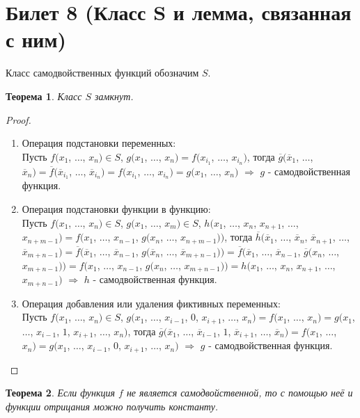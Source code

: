 \documentclass[a4paper, 12pt]{article}
\theoremstyle{definition}
\theoremstyle{plain}
\newtheorem*{theorem}{Теорема}
\theoremstyle{remark}
\begin{document}
  \section{Билет 8 (Класс S и лемма, связанная с ним)}
  Класс самодвойственных функций обозначим $S$.
  \begin{theorem}
    Класс $S$ замкнут.
  \end{theorem}
  \begin{proof}
    \begin{enumerate}
      \item Операция подстановки переменных:\\
      Пусть $f(x_1$, $\ldots$, $x_n)\in S$, $g(x_1$, $\ldots$, $x_n)=f(x_{i_1}$, $\ldots$, $x_{i_n})$, тогда $\overline{g}(\overline{x}_1$, $\ldots$, $\overline{x}_n)=\overline{f}(\overline{x}_{i_1}$, $\ldots$, $\overline{x}_{i_n})=f(x_{i_1}$, $\ldots$, $x_{i_n})=g(x_1$, $\ldots$, $x_n)$ $\Longrightarrow$ $g$ - самодвойственная функция.
      \item Операция подстановки функции в функцию:\\
      Пусть $f(x_1$, $\ldots$, $x_n)\in S$, $g(x_1$, $\ldots$, $x_m)\in S$, $h(x_1$, $\ldots$, $x_n$, $x_{n+1}$, $\ldots$, $x_{n+m-1})=f(x_1$, $\ldots$, $x_{n-1}$, $g(x_n$, $\ldots$, $x_{n+m-1}))$, тогда $\overline{h}(\overline{x}_1$, $\ldots$, $\overline{x}_n$, $\overline{x}_{n+1}$, $\ldots$, $\overline{x}_{m+n-1})=\overline{f}(\overline{x}_1$, $\ldots$, $\overline{x}_{n-1}$, $g(\overline{x}_{n}$, $\ldots$, $\overline{x}_{m+n-1}))=\overline{f}(\overline{x}_1$, $\ldots$, $\overline{x}_{n-1}$, $\overline{g}(x_{n}$, $\ldots$, $x_{m+n-1}))=f(x_1$, $\ldots$, $x_{n-1}$, $g(x_{n}$, $\ldots$, $x_{m+n-1}))=h(x_1$, $\ldots$, $x_n$, $x_{n+1}$, $\ldots$, $x_{m+n-1})$ $\Longrightarrow$ $h$ - самодвойственная функция.
      \item Операция добавления или удаления фиктивных переменных:\\
      Пусть $f(x_1$, $\ldots$, $x_n)\in S$, $g(x_1$, $\ldots$, $x_{i-1}$, $0$, $x_{i+1}$, $\ldots$,  $x_n) = f(x_1$, $\ldots$, $x_n)=g(x_1$, $\ldots$, $x_{i-1}$, $1$, $x_{i+1}$, $\ldots$,  $x_n)$, тогда $\overline{g}(\overline{x}_1$, $\ldots$, $\overline{x}_{i-1}$, $1$, $\overline{x}_{i+1}$, $\ldots$,  $\overline{x}_n) = f(x_1$, $\ldots$, $x_n)=g(x_1$, $\ldots$, $x_{i-1}$, $0$, $x_{i+1}$, $\ldots$,  $x_n)$ $\Longrightarrow$ $g$ - самодвойственная функция. 
    \end{enumerate}
  \end{proof}
  \begin{theorem}
    Если функция $f$ не является самодвойственной, то с помощью неё и функции отрицания можно получить константу.
  \end{theorem}
\end{document}
